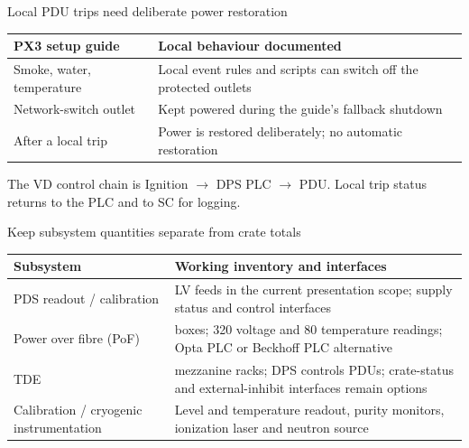 \begin{frame}{Local PDU trips need deliberate power restoration}
  \renewcommand{\arraystretch}{1.45}
  \begin{tabularx}{\textwidth}{@{}>{\RaggedRight\arraybackslash}p{3.7cm}>{\RaggedRight\arraybackslash}X@{}}
    \toprule
    \textbf{PX3 setup guide} & \textbf{Local behaviour documented}\\
    \midrule
    Smoke, water, temperature & Local event rules and scripts can switch off the protected outlets\\
    Network-switch outlet & Kept powered during the guide's fallback shutdown\\
    After a local trip & Power is restored deliberately; no automatic restoration\\
    \bottomrule
  \end{tabularx}\par
  \bigskip
  The VD control chain is Ignition $\rightarrow$ DPS PLC $\rightarrow$ PDU.
  Local trip status returns to the PLC and to SC for logging.
\end{frame}

\begin{frame}{Keep subsystem quantities separate from crate totals}
  \renewcommand{\arraystretch}{1.35}
  \begin{tabularx}{\textwidth}{@{}>{\RaggedRight\arraybackslash}p{3.2cm}>{\RaggedRight\arraybackslash}X@{}}
    \toprule
    \textbf{Subsystem} & \textbf{Working inventory and interfaces}\\
    \midrule
    PDS readout / calibration & 34 LV feeds in the current presentation scope; supply status and control interfaces\\
    Power over fibre (PoF) & 80 boxes; 320 voltage and 80 temperature readings; Opta PLC or Beckhoff PLC alternative\\
    TDE & 20 mezzanine racks; DPS controls PDUs; crate-status and external-inhibit interfaces remain options\\
    Calibration / cryogenic instrumentation & Level and temperature readout, purity monitors, ionization laser and neutron source\\
    \bottomrule
  \end{tabularx}
\end{frame}

